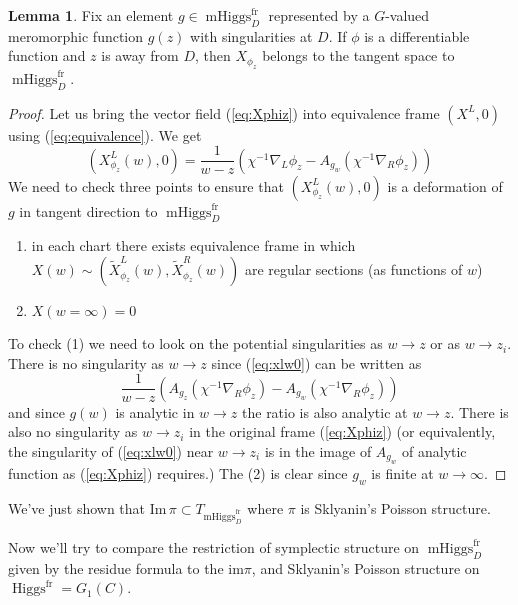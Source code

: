 \documentclass[11pt, oneside, reqno]{amsart}
\theoremstyle{definition} \newtheorem{definition}{Definition}[section]
\newtheorem{lemma}[definition]{Lemma}
\theoremstyle{definition} \newtheorem{remark}[definition]{Remark}
\theoremstyle{definition} \newtheorem{remarks}[definition]{Remarks}
\theoremstyle{definition} \newtheorem{question}[definition]{Question}
\theoremstyle{definition} \newtheorem*{note}{Note}
\theoremstyle{definition} \newtheorem{example}[definition]{Example}
\theoremstyle{definition} \newtheorem{examples}[definition]{Examples}
\DeclareMathOperator{\higgs}{Higgs}
\DeclareMathOperator{\mhiggs}{mHiggs}
\newcommand{\fr}{\mathrm{fr}}
\begin{document}
\begin{lemma}\label{phitoX}
  Fix an element $g \in \mhiggs^{\fr}_{D}$ represented by a $G$-valued
  meromorphic function $g(z)$ with singularities at $D$.    If $\phi$ is a differentiable function and $z$ is away from $D$, then $X_{\phi_z}$
  belongs to the tangent space to $\mhiggs^{\fr}_{D}$. 
\end{lemma}
\begin{proof}
  Let us bring the vector field (\ref{eq:Xphiz}) into equivalence frame $(X^{L}, 0)$ using
  (\ref{eq:equivalence}). We get
  \begin{equation}
\label{eq:xlw0}
(X^L_{\phi_z} (w) , 0) =  \frac{1}{w - z} ( \chi^{-1} \nabla_{L} \phi_z  - A_{g_{w}} (\chi^{-1}\nabla_{R} \phi_{z}))
  \end{equation}
  We need to check three points to ensure that $(X^L_{\phi_z} (w) , 0) $ is a deformation
  of $g$ in tangent direction to $\mhiggs^{\fr}_{D}$
  \begin{enumerate}
  \item in each chart there exists equivalence frame in which $X(w) \sim (\tilde X_{\phi_{z}}^{L}(w), \tilde X_{\phi_{z}}^{R}(w))$  are regular sections (as functions of $w$)
  \item $X(w = \infty) = 0$
  \end{enumerate}
  To check (1) we need to look on the potential singularities as $w \to z$ or as $w \to z_i$.
  There is no singularity as $w \to z$ since (\ref{eq:xlw0}) can be written
  as
  \begin{equation}
    \frac{1}{w - z} ( A_{g_z}( \chi^{-1} \nabla_{R} \phi_z)  - A_{g_{w}} (\chi^{-1}\nabla_{R} \phi_{z}))
  \end{equation}
  and since $g(w)$ is analytic in $w \to z$ the ratio is also analytic at $w \to z$.
  There is also no singularity as $w \to z_i$ in the original frame (\ref{eq:Xphiz}) 
  (or equivalently, the singularity of (\ref{eq:xlw0}) near $w \to z_i$ 
  is in the image of $A_{g_{w}}$ of analytic function as (\ref{eq:Xphiz}) requires.)
 The (2) is clear since $g_{w}$ is finite at $w \to \infty$. 
\end{proof}

We've just shown that $\mathrm{Im} \, \pi \subset T_{\mhiggs^{\fr}_{D}}$ where
$\pi$ is Sklyanin's Poisson structure. 

Now we'll try to compare the restriction of symplectic
structure on $\mhiggs^{\fr}_{D}$ given by the residue formula to the $\mathrm{im} \pi$, 
and Sklyanin's Poisson structure on $\higgs^{\fr} = G_1(C)$. 
\end{document}

